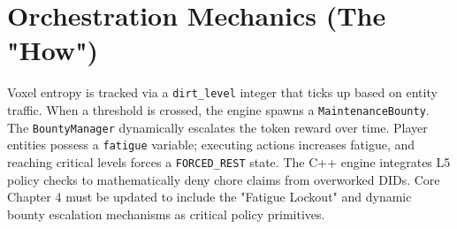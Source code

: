 \section{Orchestration Mechanics (The "How")}
Voxel entropy is tracked via a \texttt{dirt\_level} integer that ticks up based on entity traffic. When a threshold is crossed, the engine spawns a \texttt{MaintenanceBounty}. The \texttt{BountyManager} dynamically escalates the token reward over time. Player entities possess a \texttt{fatigue} variable; executing actions increases fatigue, and reaching critical levels forces a \texttt{FORCED\_REST} state. The C++ engine integrates L5 policy checks to mathematically deny chore claims from overworked DIDs. Core Chapter 4 must be updated to include the "Fatigue Lockout" and dynamic bounty escalation mechanisms as critical policy primitives.

